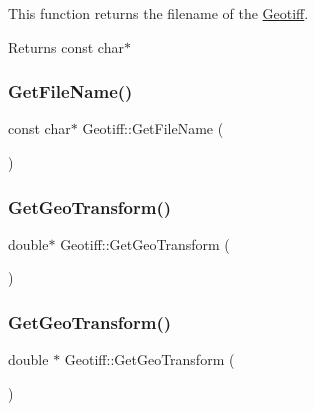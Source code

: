 This function returns the filename of the \hyperlink{class_geotiff}{Geotiff}. 

\begin{DoxyReturn}{Returns}
const char$\ast$ 
\end{DoxyReturn}
\mbox{\label{class_geotiff_aeb82472b9254e45524452b0f863b959a}} 
\subsubsection{\texorpdfstring{Get\+File\+Name()}{GetFileName()}\hspace{0.1cm}{\footnotesize\ttfamily [2/2]}}
{\footnotesize\ttfamily const char$\ast$ Geotiff\+::\+Get\+File\+Name (\begin{DoxyParamCaption}{ }\end{DoxyParamCaption})}

\mbox{\label{class_geotiff_a1a6e245b2cc91caf27c1aac3ad12b96a}} 
\subsubsection{\texorpdfstring{Get\+Geo\+Transform()}{GetGeoTransform()}\hspace{0.1cm}{\footnotesize\ttfamily [1/2]}}
{\footnotesize\ttfamily double$\ast$ Geotiff\+::\+Get\+Geo\+Transform (\begin{DoxyParamCaption}{ }\end{DoxyParamCaption})}

\mbox{\label{class_geotiff_a7dee40d63ee0669f7277407409036399}} 
\subsubsection{\texorpdfstring{Get\+Geo\+Transform()}{GetGeoTransform()}\hspace{0.1cm}{\footnotesize\ttfamily [2/2]}}
{\footnotesize\ttfamily double $\ast$ Geotiff\+::\+Get\+Geo\+Transform (\begin{DoxyParamCaption}{ }\end{DoxyParamCaption})}



